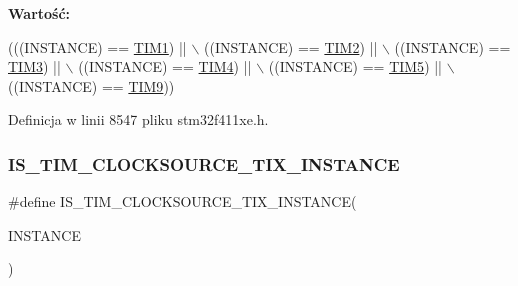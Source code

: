 {\bfseries Wartość\+:}
\begin{DoxyCode}
(((INSTANCE) == \hyperlink{group___peripheral__declaration_ga2e87451fea8dc9380056d3cfc5ed81fb}{TIM1}) || \(\backslash\)
                                                        ((INSTANCE) == \hyperlink{group___peripheral__declaration_ga3cfac9f2e43673f790f8668d48b4b92b}{TIM2}) || \(\backslash\)
                                                        ((INSTANCE) == \hyperlink{group___peripheral__declaration_ga61ee4c391385607d7af432b63905fcc9}{TIM3}) || \(\backslash\)
                                                        ((INSTANCE) == \hyperlink{group___peripheral__declaration_ga91a09bad8bdc7a1cb3d85cf49c94c8ec}{TIM4}) || \(\backslash\)
                                                        ((INSTANCE) == \hyperlink{group___peripheral__declaration_ga5125ff6a23a2ed66e2e19bd196128c14}{TIM5}) || \(\backslash\)
                                                        ((INSTANCE) == \hyperlink{group___peripheral__declaration_gaf52b4b4c36110a0addfa98059f54a50e}{TIM9}))
\end{DoxyCode}


Definicja w linii 8547 pliku stm32f411xe.\+h.

\mbox{\label{group___exported__macros_gacbd23fd1f9f73dc249b16c89131a671c}} 
\subsubsection{\texorpdfstring{I\+S\+\_\+\+T\+I\+M\+\_\+\+C\+L\+O\+C\+K\+S\+O\+U\+R\+C\+E\+\_\+\+T\+I\+X\+\_\+\+I\+N\+S\+T\+A\+N\+CE}{IS\_TIM\_CLOCKSOURCE\_TIX\_INSTANCE}}
{\footnotesize\ttfamily \#define I\+S\+\_\+\+T\+I\+M\+\_\+\+C\+L\+O\+C\+K\+S\+O\+U\+R\+C\+E\+\_\+\+T\+I\+X\+\_\+\+I\+N\+S\+T\+A\+N\+CE(\begin{DoxyParamCaption}\item[{}]{I\+N\+S\+T\+A\+N\+CE }\end{DoxyParamCaption})}


